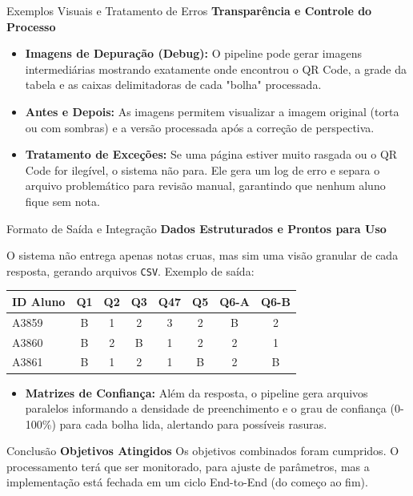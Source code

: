 \documentclass[aspectratio=169]{beamer}
\begin{document}
\begin{frame}{Exemplos Visuais e Tratamento de Erros}
    \textbf{Transparência e Controle do Processo}
    
    \vspace{0.3cm}
    \begin{itemize}
        \item \textbf{Imagens de Depuração (Debug):} O pipeline pode gerar imagens intermediárias mostrando exatamente onde encontrou o QR Code, a grade da tabela e as caixas delimitadoras de cada "bolha" processada.
        \item \textbf{Antes e Depois:} As imagens permitem visualizar a imagem original (torta ou com sombras) e a versão processada após a correção de perspectiva.
        \item \textbf{Tratamento de Exceções:} Se uma página estiver muito rasgada ou o QR Code for ilegível, o sistema não para. Ele gera um log de erro e separa o arquivo problemático para revisão manual, garantindo que nenhum aluno fique sem nota.
    \end{itemize}
\end{frame}

\begin{frame}{Formato de Saída e Integração}
    \textbf{Dados Estruturados e Prontos para Uso}
    
    \vspace{0.3cm}
    O sistema não entrega apenas notas cruas, mas sim uma visão granular de cada resposta, gerando arquivos \texttt{CSV}. Exemplo de saída:
    
    \vspace{0.2cm}
    \begin{table}[]
        \centering
        \small
        \begin{tabular}{lccccccc}
            \toprule
            \textbf{ID Aluno} & \textbf{Q1} & \textbf{Q2} & \textbf{Q3} & \textbf{Q47} & \textbf{Q5} & \textbf{Q6-A} & \textbf{Q6-B} \\
            \midrule
            A3859 & B & 1 & 2 & 3 & 2 & B & 2 \\
            A3860 & B & 2 & B & 1 & 2 & 2 & 1 \\
            A3861 & B & 1 & 2 & 1 & B & 2 & B \\
            \bottomrule
        \end{tabular}
    \end{table}

    \vspace{0.2cm}
    \begin{itemize}
        \item \textbf{Matrizes de Confiança:} Além da resposta, o pipeline gera arquivos paralelos informando a densidade de preenchimento e o grau de confiança (0-100\%) para cada bolha lida, alertando para possíveis rasuras.
    \end{itemize}
\end{frame}

\begin{frame}{Conclusão}
    \textbf{Objetivos Atingidos}
    Os objetivos combinados foram cumpridos. O processamento terá que ser monitorado, para ajuste de parâmetros,
    mas a implementação está fechada em um ciclo End-to-End (do começo ao fim).
\end{frame}
\end{document}
